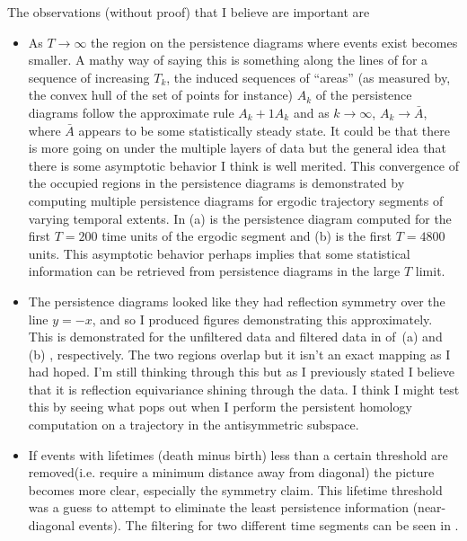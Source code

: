\begin{description}
{\begin{description}
The observations (without proof) that I believe are important are
\begin{itemize}
\item
    As $T \rightarrow \infty$ the region on the persistence diagrams where events
    exist becomes smaller. A mathy way of saying this is something along the
    lines of for a sequence of increasing $T_k$, the induced sequences of
    ``areas'' (as measured by, the convex hull of the set of points for instance)
    $A_k$ of the persistence diagrams follow the approximate rule $A_k+1
     A_k$ and as $k \rightarrow \infty$, $A_k \rightarrow \bar{A}$,
    where $\bar{A}$ appears to be some statistically steady state. It could be
    that there is more going on under the multiple layers of data but the general
    idea that there is some asymptotic behavior I think is well merited. This
    convergence of the occupied regions in the persistence diagrams is
    demonstrated by computing multiple persistence diagrams for ergodic
    trajectory segments of varying temporal extents. In  (a)
    is the persistence diagram computed for the first $T=200$ time units of the
    ergodic segment and (b) is the first $T=4800$ units. This asymptotic behavior
    perhaps implies that some statistical information can be retrieved from
    persistence diagrams in the large $T$ limit.
\item
    The persistence diagrams looked like they had reflection symmetry over the
    line $y=-x$, and so I produced figures demonstrating this approximately. This
    is demonstrated for the unfiltered data and filtered data in of
    \,(a) and (b) , respectively. The two regions overlap
    but it isn't an exact mapping as I had hoped. I'm still thinking through this
    but as I previously stated I believe that it is reflection equivariance
    shining through the data. I think I might test this by seeing what pops out
    when I perform the persistent homology computation on a trajectory in the
    antisymmetric subspace.
\item
    If events with lifetimes (death minus birth) less than a certain threshold
    are removed(i.e. require a minimum distance away from diagonal) the picture
    becomes more clear, especially the symmetry claim. This lifetime threshold
    was a guess to attempt to eliminate the least persistence information
    (near-diagonal eve\-nts). The filtering for two different time segments can
    be seen in .
\end{itemize}


\end{description}}
\end{description}
